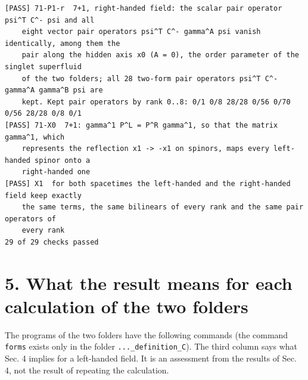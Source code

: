 \documentclass[
  10pt,
]{article}
\begin{document}
\begin{verbatim}
[PASS] 71-P1-r  7+1, right-handed field: the scalar pair operator psi^T C^- psi and all
    eight vector pair operators psi^T C^- gamma^A psi vanish identically, among them the
    pair along the hidden axis x0 (A = 0), the order parameter of the singlet superfluid
    of the two folders; all 28 two-form pair operators psi^T C^- gamma^A gamma^B psi are
    kept. Kept pair operators by rank 0..8: 0/1 0/8 28/28 0/56 0/70 0/56 28/28 0/8 0/1
[PASS] 71-X0  7+1: gamma^1 P^L = P^R gamma^1, so that the matrix gamma^1, which
    represents the reflection x1 -> -x1 on spinors, maps every left-handed spinor onto a
    right-handed one
[PASS] X1  for both spacetimes the left-handed and the right-handed field keep exactly
    the same terms, the same bilinears of every rank and the same pair operators of
    every rank
29 of 29 checks passed
\end{verbatim}

\hypertarget{what-the-result-means-for-each-calculation-of-the-two-folders}{%
\section{5. What the result means for each calculation of the two
folders}\label{what-the-result-means-for-each-calculation-of-the-two-folders}}

The programs of the two folders have the following commands (the command
\texttt{forms} exists only in the folder \texttt{...\_definition\_C}).
The third column says what Sec. 4 implies for a left-handed field. It is
an assessment from the results of Sec. 4, not the result of repeating
the calculation.
\end{document}
